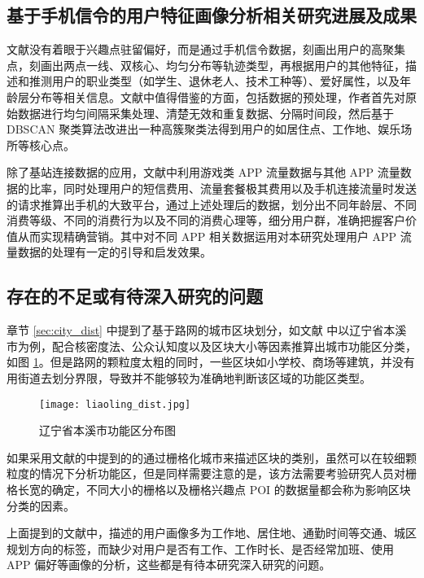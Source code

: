 \subsection{基于手机信令的用户特征画像分析相关研究进展及成果}

文献\cite{wang_huaxiang}没有着眼于兴趣点驻留偏好，而是通过手机信令数据，刻画出用户的高聚集点，刻画出两点一线、双核心、均匀分布等轨迹类型，再根据用户的其他特征，描述和推测用户的职业类型（如学生、退休老人、技术工种等）、爱好属性，以及年龄层分布等相关信息。文献中值得借鉴的方面，包括数据的预处理，作者首先对原始数据进行均匀间隔采集处理、清楚无效和重复数据、分隔时间段，然后基于 DBSCAN 聚类算法改进出一种高簇聚类法得到用户的如居住点、工作地、娱乐场所等核心点。

除了基站连接数据的应用，文献\cite{zheng_game}中利用游戏类 APP 流量数据与其他 APP 流量数据的比率，同时处理用户的短信费用、流量套餐极其费用以及手机连接流量时发送的请求推算出手机的大致平台，通过上述处理后的数据，划分出不同年龄层、不同消费等级、不同的消费行为以及不同的消费心理等，细分用户群，准确把握客户价值从而实现精确营销。其中对不同 APP 相关数据运用对本研究处理用户 APP 流量数据的处理有一定的引导和启发效果。

\subsection{存在的不足或有待深入研究的问题}
\label{sec:buzu}

章节 \ref{sec:city_dist} 中提到了基于路网的城市区块划分，如文献 \cite{xue_liaoning_dist} 中以辽宁省本溪市为例，配合核密度法、公众认知度以及区块大小等因素推算出城市功能区分类，如图 \ref{fig:liaoning}。但是路网的颗粒度太粗的同时，一些区块如小学校、商场等建筑，并没有用街道去划分界限，导致并不能够较为准确地判断该区域的功能区类型。 

\begin{figure}[htpb]
    \centering
    \texttt{[image: liaoling\_dist.jpg]}
    \caption{辽宁省本溪市功能区分布图}
    \label{fig:liaoning}
\end{figure}

如果采用文献\cite{yang_beijing_district}的中提到的的通过栅格化城市来描述区块的类别，虽然可以在较细颗粒度的情况下分析功能区，但是同样需要注意的是，该方法需要考验研究人员对栅格长宽的确定，不同大小的栅格以及栅格兴趣点 POI 的数据量都会称为影响区块分类的因素。

上面提到的文献中，描述的用户画像多为工作地、居住地、通勤时间等交通、城区规划方向的标签，而缺少对用户是否有工作、工作时长、是否经常加班、使用 APP 偏好等画像的分析，这些都是有待本研究深入研究的问题。

